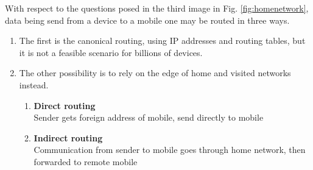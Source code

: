 With respect to the questions posed in the third image in Fig. \ref{fig:homenetwork}, data being send from a device to a mobile one may be routed in three ways.
\begin{enumerate}
   \item 
   The first is the canonical routing, using IP addresses and routing tables, but it is not a feasible scenario for billions of devices.
   \item The other possibility is to rely on the edge of home and visited networks instead.
   \begin{enumerate}
      \item \textbf{Direct routing}\\
      Sender gets foreign address of mobile, send directly to mobile
      \item \textbf{Indirect routing}\\
      Communication from sender to mobile goes through home network, then forwarded to remote mobile
   \end{enumerate}
\end{enumerate}


